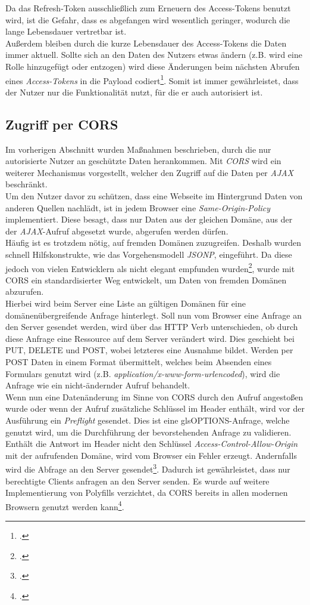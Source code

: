 Da das Refresh-Token ausschließlich zum Erneuern des Access-Tokens benutzt wird, ist die Gefahr, dass es abgefangen wird wesentlich geringer, wodurch die lange Lebensdauer vertretbar ist. \\
Außerdem bleiben durch die kurze Lebensdauer des Access-Tokens die Daten immer aktuell. Sollte sich an den Daten des Nutzers etwas ändern (z.B. wird eine Rolle hinzugefügt oder entzogen) wird diese Änderungen beim nächsten Abrufen eines \textit{Access-Tokens} in die Payload codiert\footcite{online:Implemented_OAuth_RefreshToken}. Somit ist immer gewährleistet, dass der Nutzer nur die Funktionalität nutzt, für die er auch autorisiert ist. 
\subsection{Zugriff per CORS}
\label{ssec:cors}
Im vorherigen Abschnitt wurden Maßnahmen beschrieben, durch die nur autorisierte Nutzer an geschützte Daten herankommen. Mit \textit{\ac{CORS}} wird ein weiterer Mechanismus vorgestellt, welcher den Zugriff auf die Daten per \textit{\ac{AJAX}} beschränkt. \\
Um den Nutzer davor zu schützen, dass eine Webseite im Hintergrund Daten von anderen Quellen nachlädt, ist in jedem Browser eine \textit{Same-Origin-Policy} implementiert. Diese besagt, dass nur Daten aus der gleichen Domäne, aus der der \textit{\ac{AJAX}}-Aufruf abgesetzt wurde, abgerufen werden dürfen. \\
Häufig ist es trotzdem nötig, auf fremden Domänen zuzugreifen. Deshalb wurden schnell Hilfskonstrukte, wie das Vorgehensmodell \textit{\gls{JSONP}}, eingeführt. Da diese jedoch von vielen Entwicklern als nicht elegant empfunden wurden\footcite[S. 102]{book:AngularJs:Steyer2015}, wurde mit \ac{CORS} ein standardisierter Weg entwickelt, um Daten von fremden Domänen abzurufen. \\
Hierbei wird beim Server eine Liste an gültigen Domänen für eine domänenübergreifende Anfrage hinterlegt. Soll nun vom Browser eine Anfrage an den Server gesendet werden, wird über das \ac{HTTP} Verb unterschieden, ob durch diese Anfrage eine Ressource auf dem Server verändert wird. Dies geschieht bei PUT, DELETE und POST, wobei letzteres eine Ausnahme bildet. Werden per POST Daten in einem Format übermittelt, welches beim Absenden eines Formulars genutzt wird (z.B. \textit{application/x-www-form-urlencoded}), wird die Anfrage wie ein nicht-ändernder Aufruf behandelt. \\
Wenn nun eine Datenänderung im Sinne von \ac{CORS} durch den Aufruf angestoßen wurde oder wenn der Aufruf zusätzliche Schlüssel im Header enthält, wird vor der Ausführung ein \textit{Preflight} gesendet. Dies ist eine gls{OPTIONS}-Anfrage, welche genutzt wird, um die Durchführung der bevorstehenden Anfrage zu validieren.
Enthält die Antwort im Header nicht den Schlüssel \textit{Access-Control-Allow-Origin} mit der aufrufenden Domäne, wird vom Browser ein Fehler erzeugt. Andernfalls wird die Abfrage an den Server gesendet\footcite[S. 102]{book:AngularJs:Steyer2015}. Dadurch ist gewährleistet, dass nur berechtigte Clients anfragen an den Server senden. Es wurde auf weitere Implementierung von \gls{Polyfills} verzichtet, da \ac{CORS} bereits in allen modernen Browsern genutzt werden kann\footcite{online:can-i-use:cors}.
